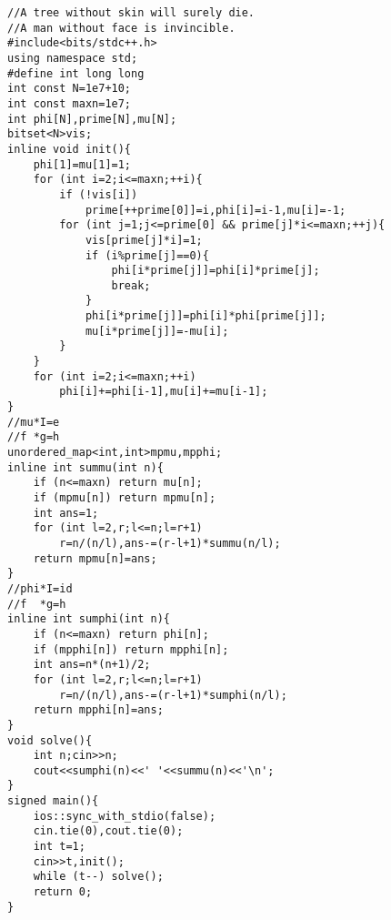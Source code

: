 \begin{verbatim}
//A tree without skin will surely die.
//A man without face is invincible.
#include<bits/stdc++.h>
using namespace std;
#define int long long
int const N=1e7+10;
int const maxn=1e7;
int phi[N],prime[N],mu[N];
bitset<N>vis;
inline void init(){
    phi[1]=mu[1]=1;
    for (int i=2;i<=maxn;++i){
        if (!vis[i])
            prime[++prime[0]]=i,phi[i]=i-1,mu[i]=-1;
        for (int j=1;j<=prime[0] && prime[j]*i<=maxn;++j){
            vis[prime[j]*i]=1;
            if (i%prime[j]==0){
                phi[i*prime[j]]=phi[i]*prime[j];
                break;
            }
            phi[i*prime[j]]=phi[i]*phi[prime[j]];
            mu[i*prime[j]]=-mu[i];
        }
    }
    for (int i=2;i<=maxn;++i)
        phi[i]+=phi[i-1],mu[i]+=mu[i-1];
}
//mu*I=e
//f *g=h
unordered_map<int,int>mpmu,mpphi;
inline int summu(int n){
    if (n<=maxn) return mu[n];
    if (mpmu[n]) return mpmu[n];
    int ans=1;
    for (int l=2,r;l<=n;l=r+1)
        r=n/(n/l),ans-=(r-l+1)*summu(n/l);
    return mpmu[n]=ans;
}
//phi*I=id
//f  *g=h
inline int sumphi(int n){
    if (n<=maxn) return phi[n];
    if (mpphi[n]) return mpphi[n];
    int ans=n*(n+1)/2;
    for (int l=2,r;l<=n;l=r+1)
        r=n/(n/l),ans-=(r-l+1)*sumphi(n/l);
    return mpphi[n]=ans;
}
void solve(){
    int n;cin>>n;
    cout<<sumphi(n)<<' '<<summu(n)<<'\n';
}
signed main(){
    ios::sync_with_stdio(false);
    cin.tie(0),cout.tie(0);
    int t=1;
    cin>>t,init();
    while (t--) solve();
    return 0;
}
\end{verbatim}